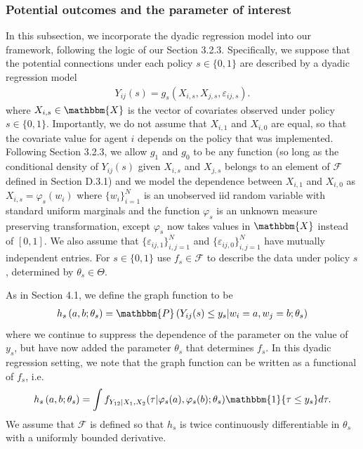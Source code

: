 \documentclass[12pt]{article}
\theoremstyle{definition}
\begin{document}
{\subsubsection{Potential outcomes and the parameter of interest}
In this subsection, we incorporate the dyadic regression model into our framework, following the logic of our Section 3.2.3. Specifically, we suppose that the potential connections under each policy $s \in \{0,1\}$ are described by a dyadic regression model
\begin{align*}
Y_{ij}(s) = g_s(X_{i,s},X_{j,s},\varepsilon_{ij,s}).
\end{align*}
where $X_{i,s} \in \mathbbm{X}$ is the vector of covariates observed under policy $s \in \{0,1\}$. Importantly, we do not assume that $X_{i,1}$ and $X_{i,0}$ are equal, so that the covariate value for agent $i$ depends on the policy that was implemented. Following Section 3.2.3, we allow $g_1$ and $g_0$ to be any function (so long as the conditional density of $Y_{ij}(s)$ given $X_{i,s}$ and $X_{j,s}$ belongs to an element of $\mathcal{F}$ defined in Section D.3.1) and we model the dependence between $X_{i,1}$ and $X_{i,0}$ as $X_{i,s} = \varphi_s(w_i)$ where $\{w_i\}_{i=1}^{N}$ is an unobserved iid random variable with standard uniform marginals and the function $\varphi_s$ is an unknown measure preserving transformation, except $\varphi_s$ now takes values in $\mathbbm{X}$ instead of $[0,1]$. We also assume that $\{\varepsilon_{ij,1}\}_{i,j=1}^{N}$ and $\{\varepsilon_{ij,0}\}_{i,j=1}^{N}$ have mutually independent entries. For $s \in \{0,1\}$ use $f_s \in \mathcal{F}$ to describe the data under policy $s$, determined by $\theta_s \in \Theta$.   

As in Section 4.1, we define the graph function to be 
\begin{align*}
 h_s\left(a,b;\theta_s\right) = \mathbbm{P}\left(Y_{ij}(s) \leq y_s| w_i = a, w_j = b; \theta_s\right)
\end{align*}
where we continue to suppress the dependence of the parameter on the value of $y_s$, but have now added the parameter $\theta_s$ that determines $f_s$. In this dyadic regression setting, we note that the graph function can be written as a functional of $f_s$, i.e.
\begin{align*}
 h_s\left(a,b;\theta_s\right) = \int f_{Y_{12}|X_1,X_2}(\tau | \varphi_s(a),\varphi_s(b);\theta_s)\mathbbm{1}\{\tau \leq y_s\}d\tau.
\end{align*}
We assume that $\mathcal{F}$ is defined so that $h_s$ is twice continuously differentiable in $\theta_s$ with a uniformly bounded derivative.   

}
\end{document}
